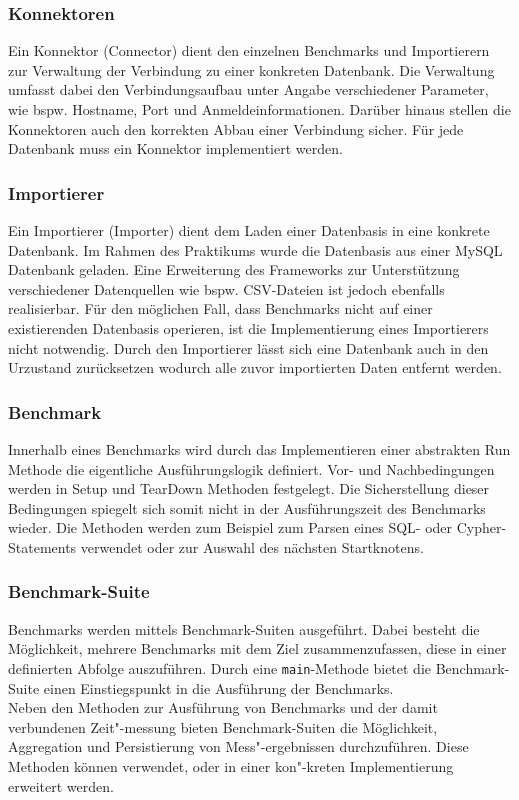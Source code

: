 \documentclass[11pt, a4paper, oneside]{article} %
\begin{document}
\subsubsection{Konnektoren}
Ein Konnektor (Connector) dient den einzelnen Benchmarks und Importierern zur Verwaltung der  Verbindung zu einer konkreten Datenbank. Die Verwaltung umfasst dabei den Verbindungsaufbau unter Angabe verschiedener Parameter, wie bspw. Hostname, Port und Anmeldeinformationen. Darüber hinaus stellen die Konnektoren auch den korrekten Abbau einer Verbindung sicher. Für jede Datenbank muss ein Konnektor implementiert werden.

\subsubsection{Importierer}
Ein Importierer (Importer) dient dem Laden einer Datenbasis in eine konkrete Datenbank. Im Rahmen des Praktikums wurde die Datenbasis aus einer MySQL Datenbank geladen. Eine Erweiterung des Frameworks zur Unterstützung verschiedener Datenquellen wie bspw. CSV-Dateien ist jedoch ebenfalls realisierbar. Für den möglichen Fall, dass Benchmarks nicht auf einer existierenden Datenbasis operieren, ist die Implementierung eines Importierers nicht notwendig. Durch den Importierer lässt sich eine Datenbank auch in den Urzustand zurücksetzen wodurch alle zuvor importierten Daten entfernt werden.

\subsubsection{Benchmark}
Innerhalb eines Benchmarks wird durch das Implementieren einer abstrakten Run Methode die eigentliche Ausführungslogik definiert. Vor- und Nachbedingungen werden in Setup und TearDown Methoden festgelegt. Die Sicherstellung dieser Bedingungen spiegelt sich somit nicht in der Ausführungszeit des Benchmarks wieder. Die Methoden werden zum Beispiel zum Parsen eines SQL- oder Cypher-Statements verwendet oder zur Auswahl des nächsten Startknotens.

\subsubsection{Benchmark-Suite}
Benchmarks werden mittels Benchmark-Suiten ausgeführt. Dabei besteht die Möglichkeit, mehrere Benchmarks mit dem Ziel zusammenzufassen, diese in einer definierten Abfolge auszuführen. Durch eine \texttt{main}-Methode bietet die Benchmark-Suite einen Einstiegspunkt in die Ausführung der Benchmarks.\\
Neben den Methoden zur Ausführung von Benchmarks und der damit verbundenen Zeit"-messung bieten Benchmark-Suiten die Möglichkeit, Aggregation und Persistierung von Mess"-ergebnissen durchzuführen. Diese Methoden können verwendet, oder in einer kon"-kreten Implementierung erweitert werden.
\end{document}
